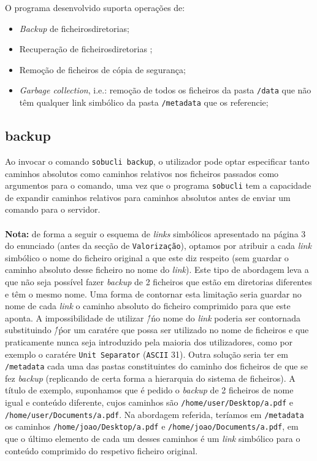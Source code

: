 \documentclass[a4paper,12pt,titlepage,portuguese]{article}
\begin{document}
O programa desenvolvido suporta operações de:

	\begin{itemize}
		\item \emph{Backup} de ficheiros\/diretorias;
		\item Recuperação de ficheiros\/diretorias ;
		\item Remoção de ficheiros de cópia de segurança;
		\item \emph{Garbage collection}, i.e.: remoção de todos os ficheiros da pasta \texttt{/data} que não têm qualquer link simbólico da pasta \texttt{/metadata} que os referencie;
	\end{itemize}

\subsection{backup}

Ao invocar o comando \texttt{sobucli backup}, o utilizador pode optar especificar tanto caminhos absolutos como caminhos relativos nos ficheiros passados como argumentos para o comando, uma vez que o programa \texttt{sobucli} tem a capacidade de expandir caminhos relativos para caminhos absolutos antes de enviar um comando para o servidor.\\\\\textbf{Nota:} de forma a seguir o esquema de \emph{links} simbólicos apresentado na página 3 do enunciado (antes da secção de \texttt{Valorização}), optamos por atribuir a cada \emph{link} simbólico o nome do ficheiro original a que este diz respeito (sem guardar o caminho absoluto desse ficheiro no nome do \emph{link}). Este tipo de abordagem leva a que não seja possível fazer \emph{backup} de 2 ficheiros que estão em diretorias diferentes e têm o mesmo nome. Uma forma de contornar esta limitação seria guardar no nome de cada \emph{link} o caminho absoluto do ficheiro comprimido para que este aponta. A impossibilidade de utilizar \'/\' no nome do \emph{link} poderia ser contornada substituindo \'/\' por um caratére que possa ser utilizado no nome de ficheiros e que praticamente nunca seja introduzido pela maioria dos utilizadores, como por exemplo o caratére \texttt{Unit Separator} (\texttt{ASCII} 31). Outra solução seria ter em \texttt{/metadata} cada uma das pastas constituintes do caminho dos ficheiros de que se fez \emph{backup} (replicando de certa forma a hierarquia do sistema de ficheiros). A título de exemplo, suponhamos que é pedido o \emph{backup} de 2 ficheiros de nome igual e conteúdo diferente, cujos caminhos são \texttt{/home/user/Desktop/a.pdf} e \texttt{/home/user/Documents/a.pdf}. Na abordagem referida, teríamos em \texttt{/metadata} os caminhos \texttt{/home/joao/Desktop/a.pdf} e \texttt{/home/joao/Documents/a.pdf}, em que o último elemento de cada um desses caminhos é um \emph{link} simbólico para o conteúdo comprimido do respetivo ficheiro original.
\end{document}
